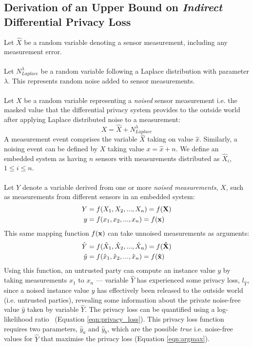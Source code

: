 \documentclass[12pt]{article}
\begin{document}
\begin{appendix}
  \section{Derivation of an Upper Bound on \textit{Indirect} Differential Privacy Loss} \label{appendix:diff_priv_loss}
    Let $\hat{X}$ be a random variable denoting a sensor measurement, including any measurement error.
    \\
    \\
    Let $N_{Laplace}^\lambda$ be a random variable following a Laplace distribution with parameter $\lambda$. This represents random noise added to sensor measurements.
    \\
    \\
    Let $X$ be a random variable representing a \textit{noised} sensor measurement i.e. the masked value that the differential privacy system provides to the outside world after applying Laplace distributed noise to a measurement:
    \begin{equation}
      X = \hat{X} + N_{Laplace}^\lambda
    \end{equation}
    A measurement event comprises the variable $\hat{X}$ taking on value $\hat{x}$. Similarly, a noising event can be defined by $X$ taking value $x = \hat{x} + n$. We define an embedded system as having $n$ sensors with measurements distributed as $\hat{X}_i$, $1 \leq i \leq n$.
    \\
    \\
    Let $Y$ denote a variable derived from one or more \textit{noised measurements}, $X$, such as measurements from different sensors in an embedded system:
    \begin{align*}
      Y & = f(X_1, X_2, ..., X_n) = f(\bf{X})\\
      y & = f(x_{1}, x_{2}, ..., x_{n}) = f(\bf{x})
    \end{align*}
    This same mapping function $f(\bf{x})$ can take unnoised measurements as arguments:
    \begin{align*}
      \hat{Y} & = f(\hat{X}_1, \hat{X}_2, ..., \hat{X}_n) = f(\bf{\hat{X}})\\
      \hat{y} & = f(\hat{x}_{1}, \hat{x}_{2}, ..., \hat{x}_{n}) = f(\bf{\hat{x}})
    \end{align*}
    Using this function, an untrusted party can compute an instance value $y$ by taking measurements $x_{1}$ to $x_{n}$ --- variable $\hat{Y}$ has experienced some privacy loss, $l_{\hat{Y}}$, since a noised instance value $y$ has effectively been released to the outside world (i.e. untrusted parties), revealing some information about the private noise-free value $\hat{y}$ taken by variable $\hat{Y}$. The privacy loss can be quantified using a log-likelihood ratio~\cite{Choi2018GuaranteeingLD} (Equation \ref{eqn:privacy_loss}). This privacy loss function requires two parameters,  $\hat{y}_a$ and $\hat{y}_b$, which are the possible \textit{true} i.e. noise-free values for $\hat{Y}$ that maximise the privacy loss (Equation \ref{eqn:argmax}).

\end{appendix}
\end{document}
